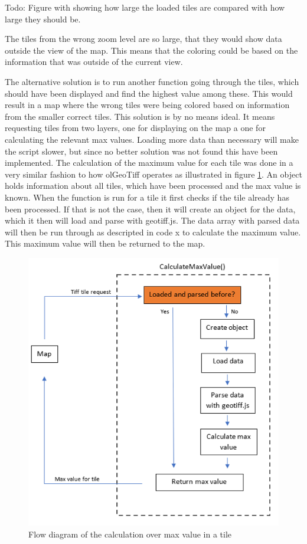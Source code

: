 Todo: Figure with showing how large the loaded tiles are compared with how large they should be.

The tiles from the wrong zoom level are so large, that they would show data outside the view of the map. This means that the coloring could be based on the information that was outside of the current view.

The alternative solution is to run another function going through the tiles, which should have been displayed and find the highest value among these. This would result in a map where the wrong tiles were being colored based on information from the smaller correct tiles. This solution is by no means ideal. It means requesting tiles from two layers, one for displaying on the map a one for calculating the relevant max values. Loading more data than necessary will make the script slower, but since no better solution was not found this have been implemented.
The calculation of the maximum value for each tile was done in a very similar fashion to how olGeoTiff operates as illustrated in figure \ref{CalculateMaxValue}. An object holds information about all tiles, which have been processed and the max value is known. When the function is run for a tile it first checks if the tile already has been processed. If that is not the case, then it will create an object for the data, which it then will load and parse with geotiff.js. The data array with parsed data will then be run through as descripted in code x to calculate the maximum value. This maximum value will then be returned to the map. 

 
\begin{figure} [H]
	\centering
	\includegraphics[width=.8\textwidth]{Pictures/CalculateMaxValue}
	\caption{Flow diagram of the calculation over max value in a tile}
	\label{CalculateMaxValue}
\end{figure}



